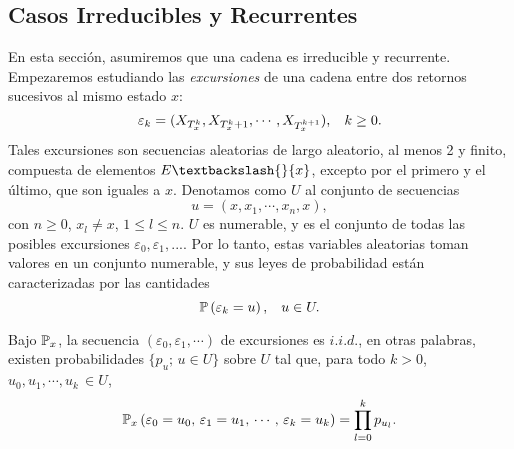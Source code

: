 \subsection{Casos Irreducibles y Recurrentes}
En esta sección, asumiremos que una cadena es irreducible y recurrente. Empezaremos estudiando las \textit{excursiones} de una cadena entre dos retornos sucesivos al mismo estado $x$:
\[\varepsilon_k = (X_{T_x^k},X_{T_x^k+1},\cdots,X_{T_x^{k+1}}),\hspace{0.3cm}k\geq 0.\]
Tales excursiones son secuencias aleatorias de largo aleatorio, al menos 2 y finito, compuesta de elementos $E\textbackslash{}\{x\}$, excepto por el primero y el último, que son iguales a $x$. Denotamos como $U$ al conjunto de secuencias
\[u = (x,x_1,\cdots,x_n,x),\]
con $n\geq 0$, $x_l\neq x$, $1\leq l \leq n$. $U$ es numerable, y es el conjunto de todas las posibles excursiones $\varepsilon_0,\varepsilon_1,...$. Por lo tanto, estas variables aleatorias toman valores en un conjunto numerable, y sus leyes de probabilidad están caracterizadas por las cantidades
\[\mathbb{P}\left(\varepsilon_k = u\right),\hspace{0.3cm}u\in U.\]

\begin{prop}
Bajo $\mathbb{P}_x$, la secuencia $(\varepsilon_0,\varepsilon_1,\cdots)$ de excursiones es $i.i.d.$, en otras palabras, existen probabilidades $\{p_u;\,u\in U\}$ sobre $U$ tal que, para todo $k>0$, $u_0,u_1,\cdots,u_k\,\in U$,
\[\mathbb{P}_x\left(\varepsilon_0 = u_0,\,\varepsilon_1 = u_1,\,\cdots,\,\varepsilon_k = u_k\right) = \prod_{l=0}^k p_{u_l}.\]
\end{prop}

